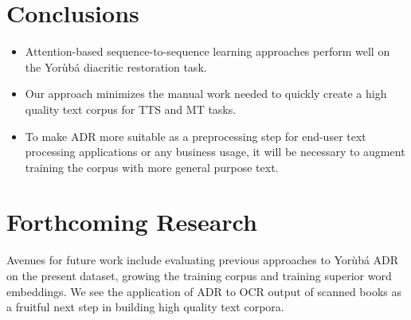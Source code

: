 \documentclass[a0,landscape]{a0poster}
\begin{document}
\begin{multicols}{4}

\color{SaddleBrown} %

\section*{Conclusions}

\begin{itemize}
\item Attention-based sequence-to-sequence learning approaches perform well on the Yor{\`u}b{\'a} diacritic restoration task.
\item Our approach minimizes the manual work needed to quickly create a high quality text corpus for TTS and MT tasks.
\item To make ADR more suitable as a preprocessing step for end-user text processing applications or any business usage, it will be necessary to augment training the corpus with more general purpose text.
\end{itemize}

\color{DarkSlateGray} %


\section*{Forthcoming Research}

Avenues for future work include evaluating previous approaches to Yor{\`u}b{\'a} ADR on the present dataset, growing the training corpus and training superior word embeddings. We see the application of ADR to OCR output of scanned books as a fruitful next step in building high quality text corpora.


\nocite{*} %



\end{multicols}
\end{document}

